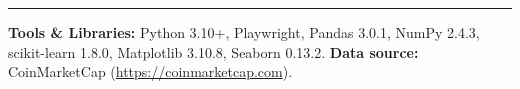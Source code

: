 \documentclass[11pt,a4paper]{article}
\begin{document}
\newpage






\vspace{1em}
\noindent\rule{\textwidth}{0.4pt}
\small
\noindent\textbf{Tools \& Libraries:}
Python 3.10+,
Playwright,
Pandas 3.0.1,
NumPy 2.4.3,
scikit-learn 1.8.0,
Matplotlib 3.10.8,
Seaborn 0.13.2.
\textbf{Data source:} CoinMarketCap (\url{https://coinmarketcap.com}).
\end{document}
